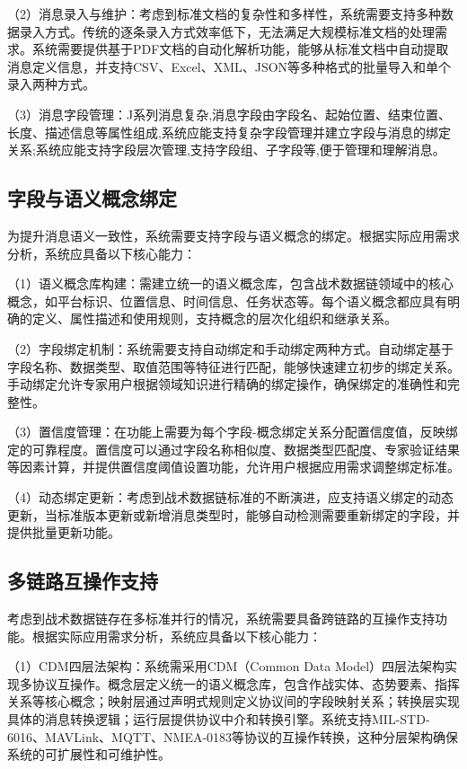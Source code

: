 （2）消息录入与维护：考虑到标准文档的复杂性和多样性，系统需要支持多种数据录入方式。传统的逐条录入方式效率低下，无法满足大规模标准文档的处理需求。系统需要提供基于PDF文档的自动化解析功能，能够从标准文档中自动提取消息定义信息，并支持CSV、Excel、XML、JSON等多种格式的批量导入和单个录入两种方式。

（3）消息字段管理：J系列消息复杂,消息字段由字段名、起始位置、结束位置、长度、描述信息等属性组成,系统应能支持复杂字段管理并建立字段与消息的绑定关系;系统应能支持字段层次管理,支持字段组、子字段等,便于管理和理解消息。


\subsection{字段与语义概念绑定}
为提升消息语义一致性，系统需要支持字段与语义概念的绑定\cite{Chelton_Link16_Antennas_2022}。根据实际应用需求分析，系统应具备以下核心能力：

（1）语义概念库构建：需建立统一的语义概念库，包含战术数据链领域中的核心概念，如平台标识、位置信息、时间信息、任务状态等。每个语义概念都应具有明确的定义、属性描述和使用规则，支持概念的层次化组织和继承关系。

（2）字段绑定机制：系统需要支持自动绑定和手动绑定两种方式。自动绑定基于字段名称、数据类型、取值范围等特征进行匹配，能够快速建立初步的绑定关系。手动绑定允许专家用户根据领域知识进行精确的绑定操作，确保绑定的准确性和完整性。

（3）置信度管理：在功能上需要为每个字段-概念绑定关系分配置信度值，反映绑定的可靠程度。置信度可以通过字段名称相似度、数据类型匹配度、专家验证结果等因素计算，并提供置信度阈值设置功能，允许用户根据应用需求调整绑定标准。

（4）动态绑定更新：考虑到战术数据链标准的不断演进，应支持语义绑定的动态更新，当标准版本更新或新增消息类型时，能够自动检测需要重新绑定的字段，并提供批量更新功能。

\subsection{多链路互操作支持}
考虑到战术数据链存在多标准并行的情况，系统需要具备跨链路的互操作支持功能\cite{AFCEA_Link16_Improvements_2022}。根据实际应用需求分析，系统应具备以下核心能力：

（1）CDM四层法架构：系统需采用CDM（Common Data Model）四层法架构实现多协议互操作。概念层定义统一的语义概念库，包含作战实体、态势要素、指挥关系等核心概念；映射层通过声明式规则定义协议间的字段映射关系；转换层实现具体的消息转换逻辑；运行层提供协议中介和转换引擎。系统支持MIL-STD-6016、MAVLink、MQTT、NMEA-0183等协议的互操作转换，这种分层架构确保系统的可扩展性和可维护性。

